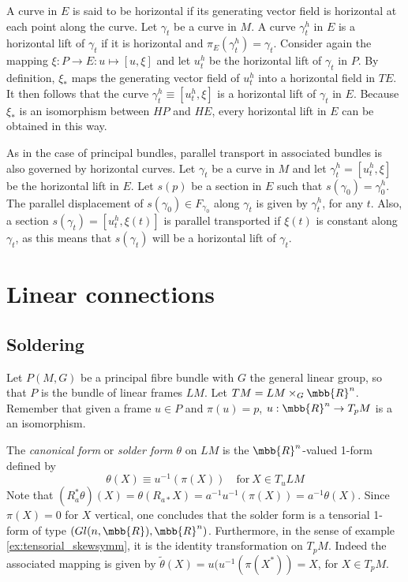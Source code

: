 \documentclass[10pt,reqno]{amsart}
\numberwithin{equation}{section}
\begin{document}
\blankline
A curve in $E$ is said to be horizontal if its generating vector 
field is horizontal at each point along the curve. Let $\gamma_t$ 
be a curve in $M$. A curve $\gamma^h_t$ in $E$ is a horizontal 
lift of $\gamma_t$ if it is horizontal and $\pi_E(\gamma^h_t) = 
\gamma_t$. Consider again the mapping $\xi : P \rightarrow E : u 
\mapsto [u,\xi]$ and let $u^h_t$ be the horizontal lift of 
$\gamma_t$ in $P$. By definition, $\xi_\ast$ maps the generating 
vector field of $u^h_t$ into a horizontal field in $TE$. It then 
follows that the curve $\gamma^h_t \equiv [u^h_t, \xi]$ is a 
horizontal lift of $\gamma_t$ in $E$. Because $\xi_\ast$ is an 
isomorphism between $HP$ and $HE$, every horizontal lift in $E$ 
can be obtained in this way.

As in the case of principal bundles, parallel transport in 
associated bundles is also governed by horizontal curves. Let 
$\gamma_t$ be a curve in $M$ and let $\gamma^h_t = [u^h_t, \xi]$ 
be the horizontal lift in $E$. Let $s(p)$ be a section in $E$ 
such that $s(\gamma_0) = \gamma^h_0$. The parallel displacement 
of $s(\gamma_0) \in F_{\gamma_0}$ along $\gamma_t$ is given by 
$\gamma^h_t$, for any $t$. Also, a section $s(\gamma_t) = 
[u^h_t,\xi(t)]$ is parallel transported if $\xi(t)$ is constant 
along $\gamma_t$, as this means that $s(\gamma_t)$ will be a 
horizontal lift of $\gamma_t$.

\section{Linear connections}

\subsection{Soldering}

Let $P(M,G)$ be a principal fibre bundle with $G$ the general 
linear group, so that $P$ is the bundle of linear frames $LM$.  
Let $TM = LM \times_G \mbb{R}^n$. Remember that given a frame $u 
\in P$ and $\pi(u) =p$, $u : \mbb{R}^n \rightarrow T_p M$ is a an 
isomorphism.

The \emph{canonical form} or \emph{solder form} $\theta$ on $LM$ 
is the $\mbb{R}^n$-valued 1-form defined by
%
\begin{equation}
	\theta(X) \equiv u^{-1}(\pi(X)) \quad \mathrm{for}\ X \in T_uLM
\end{equation}
Note that $(R^\ast_a \theta)(X) = \theta(R_{a\ast}X) = 
a^{-1}u^{-1}(\pi(X)) = a^{-1} \theta(X)$. Since $\pi(X) = 0$ for 
$X$ vertical, one concludes that the solder form is a tensorial 
1-form of type $(Gl(n,\mbb{R}),\mbb{R}^n)$. Furthermore, in the 
sense of example \ref{ex:tensorial_skewsymm}, it is the identity 
transformation on $T_pM$. Indeed the associated mapping is given 
by $\tilde{\theta}(X) = u(u^{-1}(\pi(X^\ast)) = X$, for $X \in 
T_pM$.
\end{document}
